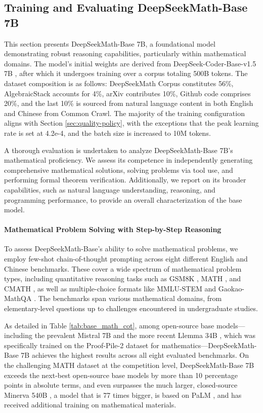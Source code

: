 \subsection{Training and Evaluating DeepSeekMath-Base 7B}

This section presents DeepSeekMath-Base 7B, a foundational model demonstrating robust reasoning capabilities, particularly within mathematical domains. The model's initial weights are derived from DeepSeek-Coder-Base-v1.5 7B \citep{deepseek-coder}, after which it undergoes training over a corpus totaling 500B tokens. The dataset composition is as follows: DeepSeekMath Corpus constitutes 56\%, AlgebraicStack accounts for 4\%, arXiv contributes 10\%, Github code comprises 20\%, and the last 10\% is sourced from natural language content in both English and Chinese from Common Crawl. The majority of the training configuration aligns with Section \ref{sec:quality-policy}, with the exceptions that the peak learning rate is set at 4.2e-4, and the batch size is increased to 10M tokens.

A thorough evaluation is undertaken to analyze DeepSeekMath-Base 7B's mathematical proficiency. We assess its competence in independently generating comprehensive mathematical solutions, solving problems via tool use, and performing formal theorem verification. Additionally, we report on its broader capabilities, such as natural language understanding, reasoning, and programming performance, to provide an overall characterization of the base model.

\paragraph{Mathematical Problem Solving with Step-by-Step Reasoning}

To assess DeepSeekMath-Base's ability to solve mathematical problems, we employ few-shot chain-of-thought prompting \citep{cot} across eight different English and Chinese benchmarks. These cover a wide spectrum of mathematical problem types, including quantitative reasoning tasks such as GSM8K \citep{gsm8k}, MATH \citep{MATH}, and CMATH \citep{wei2023cmath}, as well as multiple-choice formats like MMLU-STEM \citep{mmlu} and Gaokao-MathQA \citep{agieval}. The benchmarks span various mathematical domains, from elementary-level questions up to challenges encountered in undergraduate studies.

As detailed in Table \ref{tab:base_math_cot}, among open-source base models—including the prevalent Mistral 7B \citep{mistral} and the more recent Llemma 34B \citep{llemma}, which was specifically trained on the Proof-Pile-2 dataset \citep{llemma} for mathematics—DeepSeekMath-Base 7B achieves the highest results across all eight evaluated benchmarks. On the challenging MATH dataset at the competition level, DeepSeekMath-Base 7B exceeds the next-best open-source base models by more than 10 percentage points in absolute terms, and even surpasses the much larger, closed-source Minerva 540B \citep{minerva}, a model that is 77 times bigger, is based on PaLM \citep{palm}, and has received additional training on mathematical materials.

